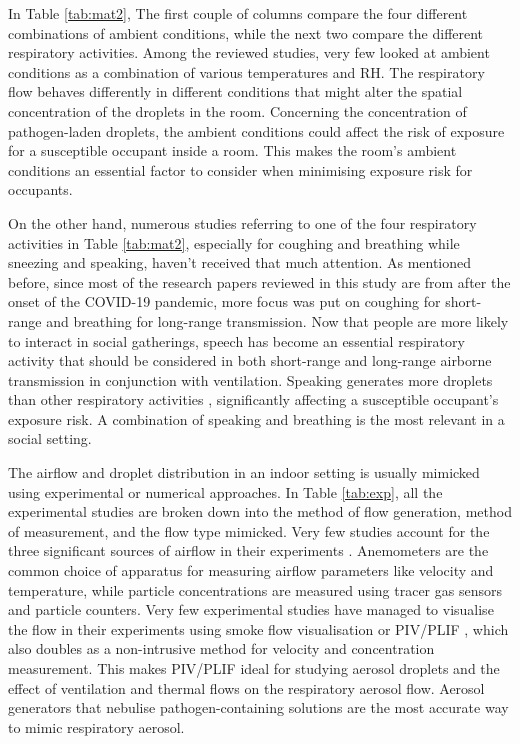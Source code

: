 \documentclass[a4paper,12pt]{elsarticle}
\begin{document}
In Table \ref{tab:mat2}, The first couple of columns compare the four different combinations of ambient conditions, while the next two compare the different respiratory activities. Among the reviewed studies, very few looked at ambient conditions as a combination of various temperatures and RH. The respiratory flow behaves differently in different conditions that might alter the spatial concentration of the droplets in the room. Concerning the concentration of pathogen-laden droplets, the ambient conditions could affect the risk of exposure for a susceptible occupant inside a room. This makes the room's ambient conditions an essential factor to consider when minimising exposure risk for occupants.

On the other hand, numerous studies referring to one of the four respiratory activities in Table \ref{tab:mat2}, especially for coughing and breathing while sneezing and speaking, haven't received that much attention. As mentioned before, since most of the research papers reviewed in this study are from after the onset of the COVID-19 pandemic, more focus was put on coughing for short-range and breathing for long-range transmission. Now that people are more likely to interact in social gatherings, speech has become an essential respiratory activity that should be considered in both short-range and long-range airborne transmission in conjunction with ventilation. Speaking generates more droplets than other respiratory activities \cite{giri2022colliding}, significantly affecting a susceptible occupant's exposure risk. A combination of speaking and breathing is the most relevant in a social setting.

The airflow and droplet distribution in an indoor setting is usually mimicked using experimental or numerical approaches. In Table \ref{tab:exp}, all the experimental studies are broken down into the method of flow generation, method of measurement, and the flow type mimicked. Very few studies account for the three significant sources of airflow in their experiments \cite{zhou2021experimental,zhang2019distribution}. Anemometers are the common choice of apparatus for measuring airflow parameters like velocity and temperature, while particle concentrations are measured using tracer gas sensors and particle counters. Very few experimental studies have managed to visualise the flow in their experiments using smoke flow visualisation \citet{saarinen2015large,giri2022colliding} or PIV/PLIF \cite{faleiros2022tu,poussou2010flow}, which also doubles as a non-intrusive method for velocity and concentration measurement. This makes PIV/PLIF ideal for studying aerosol droplets and the effect of ventilation and thermal flows on the respiratory aerosol flow. Aerosol generators that nebulise pathogen-containing solutions are the most accurate way to mimic respiratory aerosol.
\end{document}
